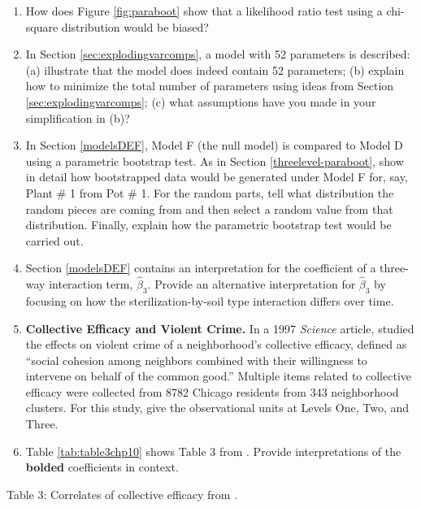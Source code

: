 \documentclass[
]{krantz}
\begin{document}
\begin{enumerate}
\item
  How does Figure \ref{fig:paraboot} show that a likelihood ratio test using a chi-square distribution would be biased?
\item
  In Section \ref{sec:explodingvarcomps}, a model with 52 parameters is described: (a) illustrate that the model does indeed contain 52 parameters; (b) explain how to minimize the total number of parameters using ideas from Section \ref{sec:explodingvarcomps}; (c) what assumptions have you made in your simplification in (b)?
\item
  In Section \ref{modelsDEF}, Model F (the null model) is compared to Model D using a parametric bootstrap test. As in Section \ref{threelevel-paraboot}, show in detail how bootstrapped data would be generated under Model F for, say, Plant \# 1 from Pot \# 1. For the random parts, tell what distribution the random pieces are coming from and then select a random value from that distribution. Finally, explain how the parametric bootstrap test would be carried out.
\item
  Section \ref{modelsDEF} contains an interpretation for the coefficient of a three-way interaction term, \(\hat{\beta}_{3}\). Provide an alternative interpretation for \(\hat{\beta}_{3}\) by focusing on how the sterilization-by-soil type interaction differs over time.
\item
  \textbf{Collective Efficacy and Violent Crime.} In a 1997 \emph{Science} article, \citet{Sampson1997} studied the effects on violent crime of a neighborhood's collective efficacy, defined as ``social cohesion among neighbors combined with their willingness to intervene on behalf of the common good.'' Multiple items related to collective efficacy were collected from 8782 Chicago residents from 343 neighborhood clusters. For this study, give the observational units at Levels One, Two, and Three.
\item
  Table \ref{tab:table3chp10} shows Table 3 from \citet{Sampson1997}. Provide interpretations of the \textbf{bolded} coefficients in context.
\end{enumerate}

\label{tab:table3chp10} Table 3: Correlates of collective efficacy from \citet{Sampson1997}.
\end{document}

